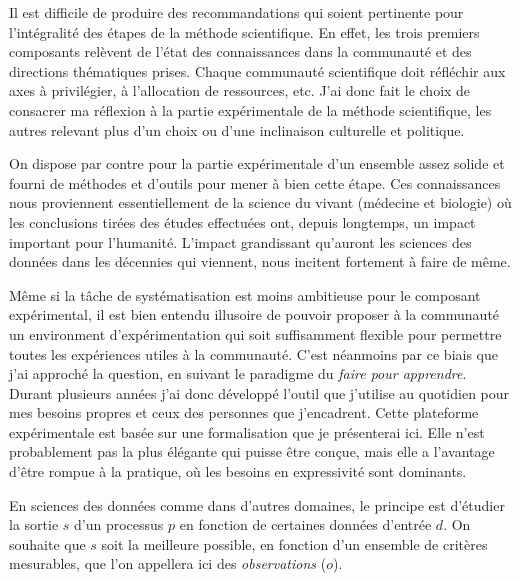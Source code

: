 Il est difficile de produire des recommandations qui soient pertinente pour l'intégralité des étapes de la méthode scientifique. En effet, les trois premiers composants relèvent de l'état des connaissances dans la communauté et des \og directions \fg thématiques prises. Chaque communauté scientifique doit réfléchir aux axes à privilégier, à l'allocation de ressources, etc. J'ai donc fait le choix de consacrer ma réflexion à la partie expérimentale de la méthode scientifique, les autres relevant plus d'un choix ou d'une inclinaison culturelle et politique.

On dispose par contre pour la partie expérimentale d'un ensemble assez solide et fourni de méthodes et d'outils pour mener à bien cette étape. Ces connaissances nous proviennent essentiellement de la science du vivant (médecine et biologie) où les conclusions tirées des études effectuées ont, depuis longtemps, un impact important pour l'humanité. L'impact grandissant qu'auront les sciences des données dans les décennies qui viennent, nous incitent fortement à faire de même.

Même si la tâche de systématisation est moins ambitieuse pour le composant expérimental, il est bien entendu illusoire de pouvoir proposer à la communauté un environment d'expérimentation qui soit suffisamment flexible pour permettre toutes les expériences utiles à la communauté. C'est néanmoins par ce biais que j'ai approché la question, en suivant le paradigme du \textsl{faire pour apprendre}. Durant plusieurs années j'ai donc développé l'outil \explanes {} que j'utilise au quotidien pour mes besoins propres et ceux des personnes que j'encadrent. Cette plateforme expérimentale est basée sur une formalisation que je présenterai ici. Elle n'est probablement pas la plus élégante qui puisse être conçue, mais elle a l'avantage d'être rompue à la pratique, où les besoins en expressivité sont dominants.



En sciences des données comme dans d'autres domaines, le principe est d'étudier la sortie $s$ d'un processus $p$ en fonction de certaines données d'entrée $d$. On souhaite que $s$ soit la meilleure possible, en fonction d'un ensemble de critères mesurables, que l'on appellera ici des \textsl{observations} ($o$).

